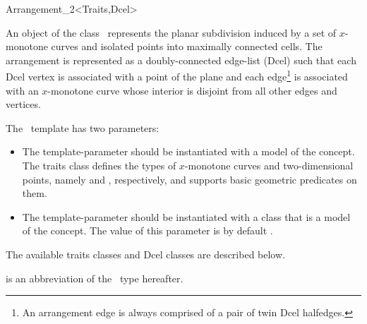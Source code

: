 
\ccRefPageBegin

\begin{ccRefClass}{Arrangement_2<Traits,Dcel>}
\label{arr_ref:arr}
    
\ccDefinition

An object  of the class \ccClassTemplateName\ represents the
planar subdivision induced by a set of $x$-monotone curves and isolated
points into maximally connected cells. The arrangement is represented as
a doubly-connected edge-list ({\sc Dcel}) such that each {\sc Dcel} vertex
is associated with a point of the plane and each edge\footnote{An arrangement
edge is always comprised of a pair of twin {\sc Dcel} halfedges.} is
associated with an $x$-monotone curve whose interior is disjoint from all
other edges and vertices.

The \ccClassTemplateName\ template has two parameters:
\begin{itemize}
\item The  template-parameter should be instantiated with
a model of the  concept. The traits
class defines the types of $x$-monotone curves and two-dimensional
points, namely  and ,
respectively, and supports basic geometric predicates on them.
\item The  template-parameter should be instantiated with
a class that is a model of the  concept. The
value of this parameter is by default
.
\end{itemize}
The available traits classes and {\sc Dcel} classes are described below. 

 is an abbreviation of the \ccRefName\ type hereafter.


\ccTypes

\ccGlue
{}



\end{ccRefClass}
